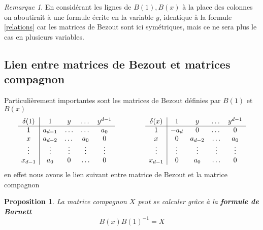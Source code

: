 \documentclass{article}
\theoremstyle{plain}%
\newtheorem{prop}{Proposition}
\theoremstyle{definition}
\theoremstyle{remark}
\newtheorem*{rem}{Remarque}
\begin{document}
\begin{rem}
En considérant les lignes de $B(1), B(x)$ à la place des colonnes on aboutirait à une formule écrite en la variable $y$, identique à la formule \ref{relations} car les matrices de Bezout sont ici symétriques, mais ce ne sera plus le cas en plusieurs variables.
\end{rem}


\subsection{Lien entre matrices de Bezout et matrices compagnon}
\label{Bar}
Particulièrement importantes sont les matrices de Bezout définies par $B(1)$ et $B(x)$
\begin{equation}
	\begin{array}{c|cccc}
		\delta(1) & 1 & y & \dots & y^{d-1} \\
		\hline
		1 & a_{d-1} & \ldots & \dots & a_0 \\
		x & a_{d-2} & \dots & a_0 & 0 \\
		\vdots & \vdots & \vdots & \vdots & \vdots \\
		x_{d-1} & a_0 & 0 & \ldots & 0 \\
	\end{array}
	\hspace{1.5cm}
	\begin{array}{c|cccc}
		\delta(x) & 1 & y & \dots & y^{d-1} \\
		\hline
		1 & -a_{d} & 0 & \dots & 0 \\
		x & 0 & a_{d-2} & \ldots & a_0 \\
		\vdots & \vdots & \vdots & \vdots & \vdots \\
		x_{d-1} & 0 & a_0 & \ldots & 0 \\
	\end{array}
\end{equation}
en effet nous avons le lien suivant entre matrice de Bezout et la matrice compagnon
\begin{prop}
\label{Barnett}
La matrice compagnon $X$ peut se calculer grâce à la {\bf formule de Barnett}
\cite{Barnett}
\begin{equation}
	B(x)B(1)^{-1} = X
\end{equation}
\end{prop}
\end{document}
